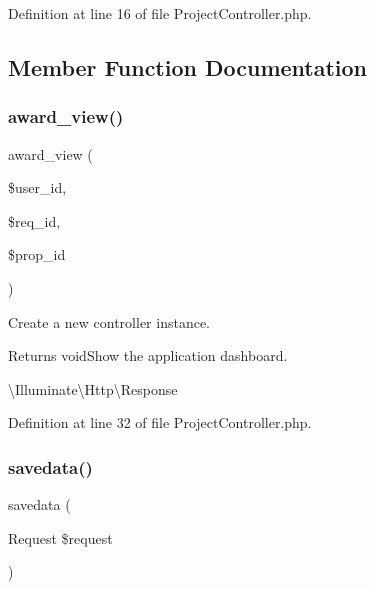 Definition at line 16 of file Project\+Controller.\+php.



\subsection{Member Function Documentation}
\mbox{\label{class_responsive_1_1_http_1_1_controllers_1_1_project_controller_ab1ed025f827e659688e648170697fbf2}} 
\subsubsection{\texorpdfstring{award\_view()}{award\_view()}}
{\footnotesize\ttfamily award\+\_\+view (\begin{DoxyParamCaption}\item[{}]{\$user\+\_\+id,  }\item[{}]{\$req\+\_\+id,  }\item[{}]{\$prop\+\_\+id }\end{DoxyParamCaption})}

Create a new controller instance.

\begin{DoxyReturn}{Returns}
void\+Show the application dashboard.

\textbackslash{}\+Illuminate\textbackslash{}\+Http\textbackslash{}\+Response 
\end{DoxyReturn}


Definition at line 32 of file Project\+Controller.\+php.

\mbox{\label{class_responsive_1_1_http_1_1_controllers_1_1_project_controller_a39992cc1c190dd16b2de573a70a7f5dc}} 
\subsubsection{\texorpdfstring{savedata()}{savedata()}}
{\footnotesize\ttfamily savedata (\begin{DoxyParamCaption}\item[{Request}]{\$request }\end{DoxyParamCaption})\hspace{0.3cm}{\ttfamily [protected]}}



